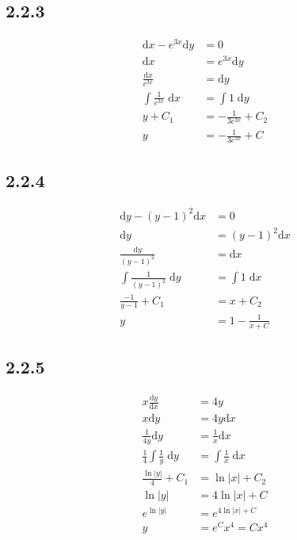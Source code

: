 \documentclass{article}
\begin{document}
\subsection{2.2.3}
\begin{align*}
    \mathrm{d}x-e^{3x}\mathrm{d}y &= 0 \\
    \mathrm{d}x &= e^{3x}\mathrm{d}y \\
    \frac{\mathrm{d}x}{e^{3x}} &= \mathrm{d}y \\
    \int \frac{1}{e^{3x}} \; \mathrm{d}x &= \int 1 \; \mathrm{d}y \\
    y+C_1 &= -\frac{1}{3e^{3x}}+C_2 \\
    y  &=  -\frac{1}{3e^{3x}}+C
\end{align*}

\newpage
\subsection{2.2.4}
\begin{align*}
    \mathrm{d}y-\left(y-1\right)^2 \mathrm{d}x &= 0 \\
    \mathrm{d}y &= \left(y-1\right)^2\mathrm{d}x \\
    \frac{\mathrm{d}y}{\left(y-1\right)^2} &= \mathrm{d}x \\
    \int \frac{1}{\left(y-1\right)^2} \; \mathrm{d}y &= \int 1 \; \mathrm{d}x \\
    \frac{-1}{y-1} +C_1 &= x+ C_2 \\
    y &=1- \frac{1}{x+C}
\end{align*}

\subsection{2.2.5}
\begin{align*}
    x \frac{\mathrm{d}y}{\mathrm{d}x} &= 4y \\
    x\mathrm{d}y &= 4y\mathrm{d}x \\
    \frac{1}{4y}\mathrm{d}y &= \frac{1}{x}\mathrm{d}x \\
    \frac{1}{4}\int \frac{1}{y} \; \mathrm{d}y &= \int \frac{1}{x} \; \mathrm{d}x \\
    \frac{\ln |y| }{4} +C_1 &= \ln |x| + C_2 \\
    \ln |y|  &=  4\ln|x| +C \\
    e^{\ln |y|} &= e^{4\ln|x|+C} \\
    y  &= e^{C}x^{4} = Cx^4 
\end{align*}
\end{document}
